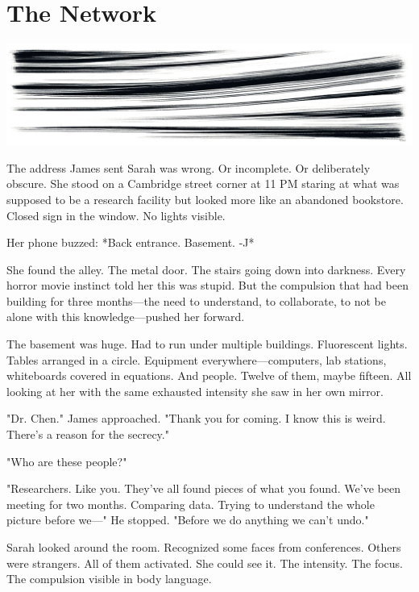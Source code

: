\chapter{The Network}
\label{ch:20}



\begin{center}
\includegraphics[width=\textwidth]{images/chapterImages/genesis_sketch_00117_.png}
\end{center}

The address James sent Sarah was wrong. Or incomplete. Or deliberately obscure. She stood on a Cambridge street corner at 11 PM staring at what was supposed to be a research facility but looked more like an abandoned bookstore. Closed sign in the window. No lights visible.

Her phone buzzed: *Back entrance. Basement. -J*

She found the alley. The metal door. The stairs going down into darkness. Every horror movie instinct told her this was stupid. But the compulsion that had been building for three months—the need to understand, to collaborate, to not be alone with this knowledge—pushed her forward.

The basement was huge. Had to run under multiple buildings. Fluorescent lights. Tables arranged in a circle. Equipment everywhere—computers, lab stations, whiteboards covered in equations. And people. Twelve of them, maybe fifteen. All looking at her with the same exhausted intensity she saw in her own mirror.

"Dr. Chen." James approached. "Thank you for coming. I know this is weird. There's a reason for the secrecy."

"Who are these people?"

"Researchers. Like you. They've all found pieces of what you found. We've been meeting for two months. Comparing data. Trying to understand the whole picture before we—" He stopped. "Before we do anything we can't undo."

Sarah looked around the room. Recognized some faces from conferences. Others were strangers. All of them activated. She could see it. The intensity. The focus. The compulsion visible in body language.

